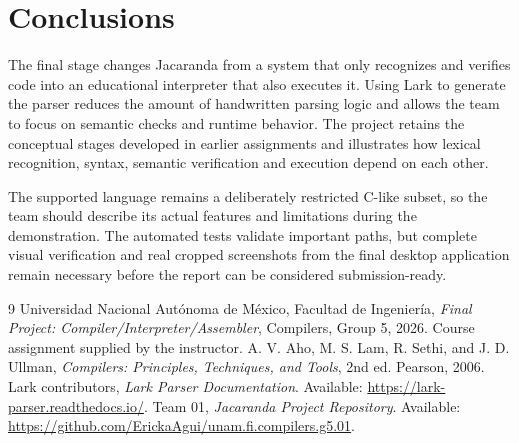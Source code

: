 \documentclass[letterpaper,12pt,oneside]{article}
\begin{document}
\section{Conclusions}
The final stage changes Jacaranda from a system that only recognizes and verifies code into an educational interpreter that also executes it. Using Lark to generate the parser reduces the amount of handwritten parsing logic and allows the team to focus on semantic checks and runtime behavior. The project retains the conceptual stages developed in earlier assignments and illustrates how lexical recognition, syntax, semantic verification and execution depend on each other.

The supported language remains a deliberately restricted C-like subset, so the team should describe its actual features and limitations during the demonstration. The automated tests validate important paths, but complete visual verification and real cropped screenshots from the final desktop application remain necessary before the report can be considered submission-ready.

\begin{thebibliography}{9}
 Universidad Nacional Autónoma de México, Facultad de Ingeniería, \emph{Final Project: Compiler/Interpreter/Assembler}, Compilers, Group 5, 2026. Course assignment supplied by the instructor.
 A. V. Aho, M. S. Lam, R. Sethi, and J. D. Ullman, \emph{Compilers: Principles, Techniques, and Tools}, 2nd ed. Pearson, 2006.
 Lark contributors, \emph{Lark Parser Documentation}. Available: \url{https://lark-parser.readthedocs.io/}.
 Team 01, \emph{Jacaranda Project Repository}. Available: \url{https://github.com/ErickaAgui/unam.fi.compilers.g5.01}.
\end{thebibliography}
\end{document}

